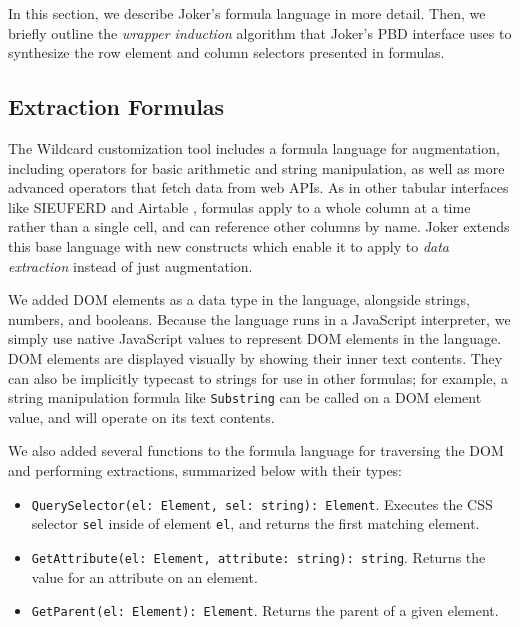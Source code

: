\documentclass[sigconf,10pt]{acmart}
\providecommand{\tightlist}{%
  \setlength{\itemsep}{0pt}\setlength{\parskip}{0pt}}
\begin{document}
In this section, we describe Joker's formula language in more detail.
Then, we briefly outline the \emph{wrapper induction}
\citep{kushmerick2000} algorithm that Joker's PBD interface uses to
synthesize the row element and column selectors presented in formulas.

\hypertarget{extraction-formulas}{%
\subsection{Extraction Formulas}\label{extraction-formulas}}

The Wildcard customization tool includes a formula language for
augmentation, including operators for basic arithmetic and string
manipulation, as well as more advanced operators that fetch data from
web APIs. As in other tabular interfaces like SIEUFERD \citep{bakke2016}
and Airtable \citep{2021f}, formulas apply to a whole column at a time
rather than a single cell, and can reference other columns by name.
Joker extends this base language with new constructs which enable it to
apply to \emph{data extraction} instead of just augmentation.

We added DOM elements as a data type in the language, alongside strings,
numbers, and booleans. Because the language runs in a JavaScript
interpreter, we simply use native JavaScript values to represent DOM
elements in the language. DOM elements are displayed visually by showing
their inner text contents. They can also be implicitly typecast to
strings for use in other formulas; for example, a string manipulation
formula like \texttt{Substring} can be called on a DOM element value,
and will operate on its text contents.

We also added several functions to the formula language for traversing
the DOM and performing extractions, summarized below with their types:

\begin{itemize}
\tightlist
\item
  \texttt{QuerySelector(el:\ Element,\ sel:\ string):\ Element}.
  Executes the CSS selector \texttt{sel} inside of element \texttt{el},
  and returns the first matching element.
\item
  \texttt{GetAttribute(el:\ Element,\ attribute:\ string):\ string}.
  Returns the value for an attribute on an element.
\item
  \texttt{GetParent(el:\ Element):\ Element}. Returns the parent of a
  given element.
\end{itemize}
\end{document}
